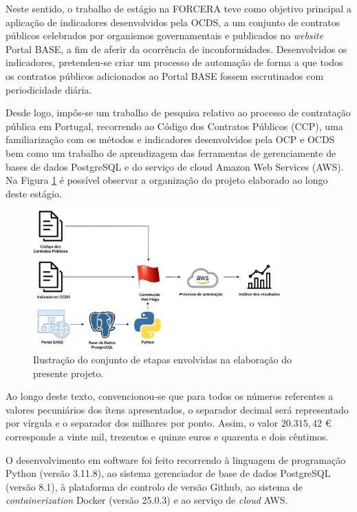 Neste sentido, o trabalho de estágio na FORCERA teve como objetivo principal a aplicação de indicadores desenvolvidos pela OCDS, a um conjunto de contratos públicos celebrados por organismos governamentais e publicados no \textit{website} Portal BASE, a fim de aferir da ocorrência de inconformidades. Desenvolvidos os indicadores, pretendeu-se criar um processo de automação de forma a que todos os contratos públicos adicionados ao Portal BASE fossem escrutinados com periodicidade diária.

Desde logo, impôs-se um trabalho de pesquisa relativo ao processo de contratação pública em Portugal, recorrendo ao Código dos Contratos Públicos (CCP), uma familiarização com os métodos e indicadores desenvolvidos pela OCP e OCDS bem como um trabalho de aprendizagem das ferramentas de gerenciamente de bases de dados PostgreSQL e do serviço de cloud Amazon Web Services (AWS). Na Figura \ref{fig:processo} é possível observar a organização do projeto elaborado ao longo deste estágio. 


\begin{figure}[H]
	\centering
	\includegraphics[width=0.85\textwidth]{imagens/processo_tese.png}
	\caption{Ilustração do conjunto de etapas envolvidas na elaboração do presente projeto. }
	\label{fig:processo}
\end{figure}

Ao longo deste texto, convencionou-se que para todos os números referentes a valores pecuniários dos ítens apresentados, o separador decimal será representado por vírgula e o separador dos milhares por ponto. Assim, o valor $20.315,42$ € corresponde a vinte mil, trezentos e quinze euros e quarenta e dois cêntimos. 

O desenvolvimento em software foi feito recorrendo à linguagem de programação Python (versão 3.11.8), ao sistema gerenciador de base de dados PostgreSQL (versão 8.1), à plataforma de controlo de versão Github, ao sistema de \textit{containerization} Docker (versão 25.0.3) e ao serviço de \textit{cloud} AWS. 




